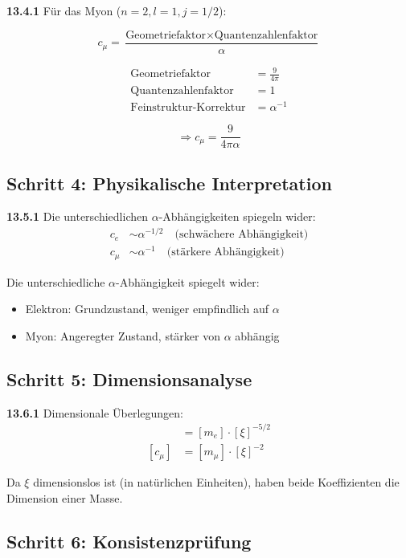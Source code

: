 \documentclass[12pt,a4paper]{article}
\begin{document}
\noindent \textbf{13.4.1} Für das Myon ($n=2, l=1, j=1/2$):

\[
c_\mu = \frac{\text{Geometriefaktor} \times \text{Quantenzahlenfaktor}}{\alpha}
\]

\begin{align*}
	\text{Geometriefaktor} &= \frac{9}{4\pi} \\
	\text{Quantenzahlenfaktor} &= 1 \\
	\text{Feinstruktur-Korrektur} &= \alpha^{-1}
\end{align*}

\[
\Rightarrow c_\mu = \frac{9}{4\pi\alpha}
\]

\subsection{Schritt 4: Physikalische Interpretation}

\noindent \textbf{13.5.1} Die unterschiedlichen $\alpha$-Abhängigkeiten spiegeln wider:
\begin{align*}
	c_e &\sim \alpha^{-1/2} \quad \text{(schwächere Abhängigkeit)} \\
	c_\mu &\sim \alpha^{-1} \quad \text{(stärkere Abhängigkeit)}
\end{align*}

Die unterschiedliche $\alpha$-Abhängigkeit spiegelt wider:
\begin{itemize}
	\item Elektron: Grundzustand, weniger empfindlich auf $\alpha$
	\item Myon: Angeregter Zustand, stärker von $\alpha$ abhängig
\end{itemize}

\subsection{Schritt 5: Dimensionsanalyse}

\noindent \textbf{13.6.1} Dimensionale Überlegungen:
\begin{align*}
	[c_e] &= [m_e] \cdot [\xi]^{-5/2} \\
	[c_\mu] &= [m_\mu] \cdot [\xi]^{-2}
\end{align*}

Da $\xi$ dimensionslos ist (in natürlichen Einheiten), haben beide Koeffizienten die Dimension einer Masse.

\subsection{Schritt 6: Konsistenzprüfung}
\end{document}
